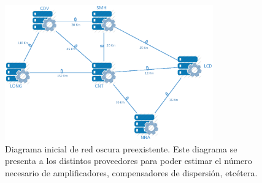 \begin{figure}[h]
\centering
\includegraphics[width=0.8\textwidth]{Imagenes/Diagrama_Fibra_Oscura.eps}
\caption{Diagrama inicial de red oscura preexistente. Este diagrama se
  presenta a los distintos proveedores para poder estimar el
  número necesario de amplificadores, compensadores de dispersión,
  etcétera.}
\end{figure}






